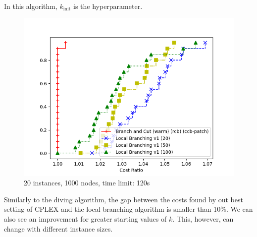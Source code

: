 In this algorithm, $k_{\text{init}}$ is the hyperparameter.

\begin{figure}[h]
    \centering
    \includegraphics*[width=.6\textwidth]{../plots/perfprof_lbv1_costs.png}
    \caption*{20 instances, 1000 nodes, time limit: 120s}
\end{figure}

Similarly to the diving algorithm, the gap between the costs found by out best setting of CPLEX and the local branching algorithm is smaller than 10\%. We can also see an improvement for greater starting values of $k$. This, however, can change with different instance sizes.